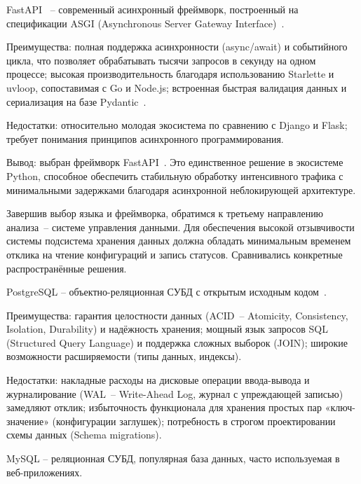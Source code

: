FastAPI~\cite{fastapi, lubanovich-fastapi} -- современный асинхронный фреймворк, построенный на спецификации ASGI (Asynchronous Server Gateway Interface)~\cite{asgi-spec}.

Преимущества: полная поддержка асинхронности (async/await) и событийного цикла, что позволяет обрабатывать тысячи запросов в секунду на одном процессе; высокая производительность благодаря использованию Starlette и uvloop, сопоставимая с Go и Node.js; встроенная быстрая валидация данных и сериализация на базе Pydantic~\cite{pydantic}.

Недостатки: относительно молодая экосистема по сравнению с Django и Flask; требует понимания принципов асинхронного программирования.

Вывод: выбран фреймворк FastAPI~\cite{fastapi, uvicorn}. Это единственное решение в экосистеме Python, способное обеспечить стабильную обработку интенсивного трафика с минимальными задержками благодаря асинхронной неблокирующей архитектуре.


Завершив выбор языка и фреймворка, обратимся к третьему направлению анализа~-- системе управления данными. Для обеспечения высокой отзывчивости системы подсистема хранения данных должна обладать минимальным временем отклика на чтение конфигураций и запись статусов. Сравнивались конкретные распространённые решения.

PostgreSQL -- объектно-реляционная СУБД с открытым исходным кодом~\cite{morgunov-postgresql}.

Преимущества: гарантия целостности данных (ACID~-- Atomicity, Consistency, Isolation, Durability) и надёжность хранения; мощный язык запросов SQL (Structured Query Language) и поддержка сложных выборок (JOIN); широкие возможности расширяемости (типы данных, индексы).

Недостатки: накладные расходы на дисковые операции ввода-вывода и журналирование (WAL~-- Write-Ahead Log, журнал с упреждающей записью) замедляют отклик; избыточность функционала для хранения простых пар «ключ-значение» (конфигурации заглушек); потребность в строгом проектировании схемы данных (Schema migrations).

MySQL -- реляционная СУБД, популярная база данных, часто используемая в веб-приложениях.

